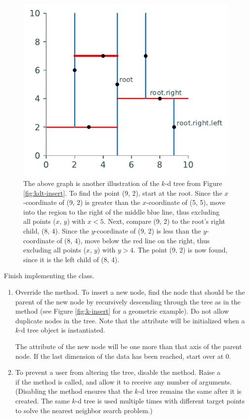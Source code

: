 \begin{figure}[H]
\includegraphics[width=.7\textwidth]{figures/kdpic4_equal.pdf}
\caption{The above graph is another illustration of the $k$-d tree from Figure \ref{fig:kdt-insert}. To find the point (9, 2), start at the root. Since the $x$-coordinate of (9, 2) is greater than the $x$-coordinate of (5, 5), move into the region to the right of the middle blue line, thus excluding all points ($x$, $y$) with $x < 5$. Next, compare (9, 2) to the root's right child, (8, 4). Since the $y$-coordinate of (9, 2) is less than the $y$-coordinate of (8, 4), move below the red line on the right, thus excluding all points ($x$, $y$) with $y > 4$. The point (9, 2) is now found, since it is the left child of (8, 4).}
\label{fig:k-binary-search}
\end{figure}

\begin{problem} %
Finish implementing the  class.
\begin{enumerate}
\item Override the  method.
To insert a new node, find the node that should be the parent of the new node by recursively descending through the tree as in the  method (see Figure \ref{fig:k-insert} for a geometric example).
Do not allow duplicate nodes in the tree.
Note that the  attribute will be initialized when a $k$-d tree object is instantiated.

The  attribute of the new node will be one more than that axis of the parent node.
If the last dimension of the data has been reached, start  over at 0.

\item %
To prevent a user from altering the tree, disable the  method.
Raise a \\  if the method is called, and allow it to receive any number of arguments.
(Disabling the  method ensures that the $k$-d tree remains the same after it is created.
The same $k$-d tree is used multiple times with different target points to solve the nearest neighbor search problem.)
\end{enumerate}
\end{problem}


